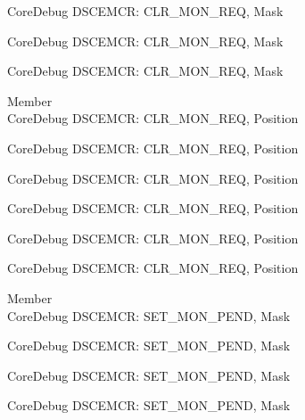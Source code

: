 \begin{DoxyRefList}
\label{deprecated__deprecated000731}%
%
Core\+Debug DSCEMCR\+: CLR\+\_\+\+MON\+\_\+\+REQ, Mask 

\label{deprecated__deprecated001182}%
%
Core\+Debug DSCEMCR\+: CLR\+\_\+\+MON\+\_\+\+REQ, Mask 

\label{deprecated__deprecated001284}%
%
Core\+Debug DSCEMCR\+: CLR\+\_\+\+MON\+\_\+\+REQ, Mask  
\item[Member \doxylink{group___c_m_s_i_s___s_c_b_ga1e2e3a310143f4663f1c415c03c3d535}{Core\+Debug\+\_\+\+DSCEMCR\+\_\+\+CLR\+\_\+\+MON\+\_\+\+REQ\+\_\+\+Pos} ]\hfill \\
\label{deprecated__deprecated000071}%
%
Core\+Debug DSCEMCR\+: CLR\+\_\+\+MON\+\_\+\+REQ, Position 

\label{deprecated__deprecated000522}%
%
Core\+Debug DSCEMCR\+: CLR\+\_\+\+MON\+\_\+\+REQ, Position 

\label{deprecated__deprecated000624}%
%
Core\+Debug DSCEMCR\+: CLR\+\_\+\+MON\+\_\+\+REQ, Position 

\label{deprecated__deprecated000730}%
%
Core\+Debug DSCEMCR\+: CLR\+\_\+\+MON\+\_\+\+REQ, Position 

\label{deprecated__deprecated001181}%
%
Core\+Debug DSCEMCR\+: CLR\+\_\+\+MON\+\_\+\+REQ, Position 

\label{deprecated__deprecated001283}%
%
Core\+Debug DSCEMCR\+: CLR\+\_\+\+MON\+\_\+\+REQ, Position  
\item[Member \doxylink{group___c_m_s_i_s___s_c_b_ga575045239507b73f338bcbb959ac6904}{Core\+Debug\+\_\+\+DSCEMCR\+\_\+\+SET\+\_\+\+MON\+\_\+\+PEND\+\_\+\+Msk} ]\hfill \\
\label{deprecated__deprecated000078}%
%
Core\+Debug DSCEMCR\+: SET\+\_\+\+MON\+\_\+\+PEND, Mask 

\label{deprecated__deprecated000529}%
%
Core\+Debug DSCEMCR\+: SET\+\_\+\+MON\+\_\+\+PEND, Mask 

\label{deprecated__deprecated000631}%
%
Core\+Debug DSCEMCR\+: SET\+\_\+\+MON\+\_\+\+PEND, Mask 

\label{deprecated__deprecated000737}%
%
Core\+Debug DSCEMCR\+: SET\+\_\+\+MON\+\_\+\+PEND, Mask 


\end{DoxyRefList}
